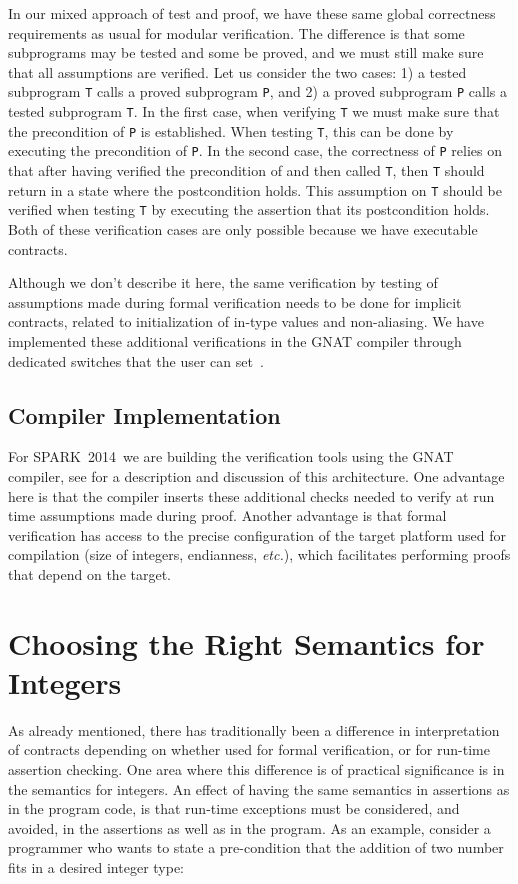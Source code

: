 \documentclass[sttt,draft]{svjour}
\newcommand{\newspark}{SPARK~2014\xspace}
\newcommand{\etc}{\textit{etc.}\xspace}
\begin{document}
In our mixed approach of test and proof, we have these same global
correctness requirements as usual for modular verification. The
difference is that some subprograms may be tested and some be proved,
and we must still make sure that all assumptions are verified. Let us
consider the two cases: 1) a tested subprogram \verb|T| calls a proved
subprogram \verb|P|, and 2) a proved subprogram \verb|P| calls a
tested subprogram \verb|T|. In the first case, when verifying \verb|T|
we must make sure that the precondition of \verb|P| is
established. When testing \verb|T|, this can be done by executing the
precondition of \verb|P|. In the second case, the correctness of
\verb|P| relies on that after having verified the precondition of and
then called \verb|T|, then \verb|T| should return in a state where the
postcondition holds. This assumption on \verb|T| should be verified
when testing \verb|T| by executing the assertion that its postcondition
holds. Both of these verification cases are only possible because we
have executable contracts.

Although we don't describe it here, the same verification by testing of
assumptions made during formal verification needs to be done for implicit
contracts, related to initialization of in-type values and non-aliasing. We
have implemented these additional verifications in the GNAT compiler through
dedicated switches that the user can set~\cite{hiliteERTS2012}.

\subsection{Compiler Implementation}
For \newspark\ we are building the verification tools using the GNAT compiler,
see \cite{ksd2012} for a description and discussion of this architecture. One
advantage here is that the compiler inserts these additional checks needed to
verify at run time assumptions made during proof. Another advantage is that
formal verification has access to the precise configuration of the target
platform used for compilation (size of integers, endianness, \etc), which
facilitates performing proofs that depend on the target.

\section{Choosing the Right Semantics for Integers}
\label{overflowsemantics}
As already mentioned, there has traditionally been a difference in
interpretation of contracts depending on whether used for formal
verification, or for run-time assertion checking. One area where this
difference is of practical significance is in the semantics for
integers. An effect of having the same semantics in assertions as in
the program code, is that run-time exceptions must be considered, and
avoided, in the assertions as well as in the program. As an example,
consider a programmer who wants to state a pre-condition that the
addition of two number fits in a desired integer type:
\end{document}
